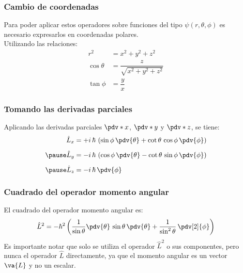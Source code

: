 \begin{frame}
\frametitle{Cambio de coordenadas}
Para poder aplicar estos operadores sobre funciones del tipo $\psi(r, \theta, \phi)$ es necesario expresarlos en coordenadas polares.
\\
\bigskip
\pause
Utilizando las relaciones:
\begin{align*}
r^{2} &= x^{2} + y^{2} +z^{2} \\
\cos \theta &= \dfrac{z}{\sqrt{x^{2} + y^{2} +z^{2}}} \\
\tan \phi &= \dfrac{y}{x}
\end{align*}
\end{frame}
\begin{frame}
\frametitle{Tomando las derivadas parciales}
Aplicando las derivadas parciales $\pdv*{x}$, $\pdv*{y}$ y $\pdv*{z}$, se tiene:
\begin{eqnarray}
\begin{aligned}
\hat{L}_{x} &= + i\, \hbar \, \left( \sin \phi \,\pdv{\theta} + \cot \theta\, \cos \phi \, \pdv{\phi} \right) \\[0.5em] \pause
\hat{L}_{y} &= - i\, \hbar \, \left( \cos \phi \,\pdv{\theta} - \cot \theta\, \sin \phi \, \pdv{\phi} \right) \\[0.5em] \pause
\hat{L}_{z} &= - i\, \hbar \, \pdv{\phi}
\end{aligned}
\label{eq:ecuacion_01_04a}
\end{eqnarray}
\end{frame}
\begin{frame}
\frametitle{Cuadrado del operador momento angular}
El cuadrado del operador momento angular es:
\begin{align}
\hat{L}^{2} = - \hbar^{2} \left( \dfrac{1}{\sin \theta} \pdv{\theta} \, \sin \theta \, \pdv{\theta} + \dfrac{1}{\sin^{2} \theta} \, \pdv[2]{\phi} \right)
\label{eq:ecuacion_01_04b}
\end{align}
\pause
Es importante notar que solo se utiliza el operador $\hat{L}^{2}$ o sus componentes, pero nunca el operador $\hat{L}$ directamente, ya que el momento angular es un vector $\va{L}$ y no un escalar.
\end{frame}
